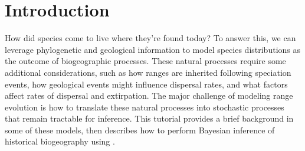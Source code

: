 \section*{Introduction}

How did species come to live where they're found today?
To answer this, we can leverage phylogenetic and geological information to model species distributions as the outcome of biogeographic processes.
These natural processes require some additional considerations, such as how ranges are inherited following speciation events, how geological events might influence dispersal rates, and what factors affect rates of dispersal and extirpation.
The major challenge of modeling range evolution is how to translate these natural processes into stochastic processes that remain tractable for inference.
This tutorial provides a brief background in some of these models, then describes how to perform Bayesian inference of historical biogeography using \RevBayes.

%
%
%
%
%
%
%
%
%
%

%

%

